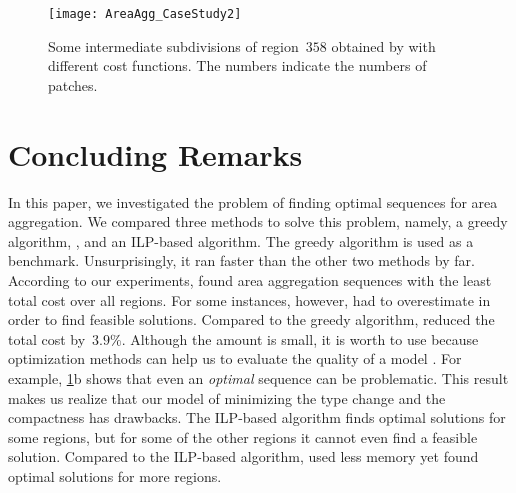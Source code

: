 \documentclass[acmsmall,natbib=false]{acmart}
\begin{document}
\begin{figure}[h!tb]
\centering
\texttt{[image: AreaAgg\_CaseStudy2]}
\caption{Some intermediate subdivisions of region~$358$ 
	obtained by \Astar with different cost functions.
	The numbers indicate the numbers of patches.
}
\label{fig:AreaAgg_CaseStudy2_Rg358}
\end{figure}



\section{Concluding Remarks}
\label{sec:AreaAgg_Conclusions}
In this paper, we investigated the problem of 
finding optimal sequences for area aggregation.
We compared three methods to solve this problem, namely, 
a greedy algorithm, \Astar, and an ILP-based algorithm.
The greedy algorithm is used as a benchmark.
Unsurprisingly, it ran faster than the other two methods by far.
According to our experiments, \Astar found area aggregation 
sequences
with the least total cost over all regions.
For some instances, however, \Astar had to overestimate
in order to find feasible solutions.
Compared to the greedy algorithm, 
\Astar reduced the total cost by~$3.9\%$.
Although the amount is small, it is worth to use \Astar
because optimization methods can help us to evaluate the quality 
of a model \parencite{Haunert2017Label,Haunert2008Assuring,Haunert2016Optimization}.
For example, \fig\ref{fig:AreaAgg_CaseStudy2_Rg358}b shows that
even an \emph{optimal} sequence can be problematic. 
This result makes us realize that our model of minimizing the 
type change and the compactness has drawbacks.
The ILP-based algorithm finds optimal solutions for some regions,
but for some of the other regions 
it cannot even find a feasible solution.
Compared to the ILP-based algorithm,
\Astar used less memory 
yet found optimal solutions for more regions.

\end{document}
